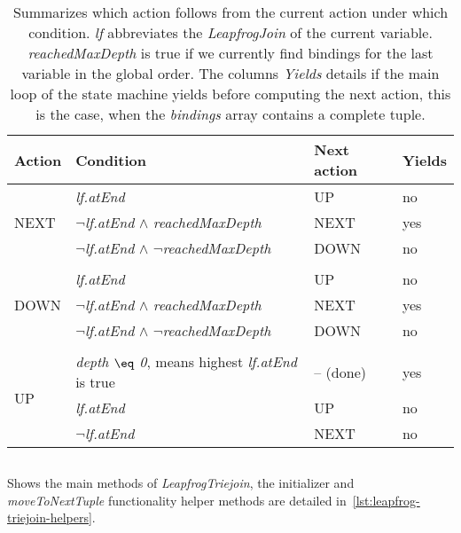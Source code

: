 \begin{table}[]
    \centering
    \begin{tabular}{@{}llll@{}}
        \toprule
        Action                & Condition                                  & Next action & Yields \\ \midrule
        \multirow{3}{*}{NEXT} & \textit{lf.atEnd}                                   & UP          & no     \\
        & \textit{$\neg$lf.atEnd} $\wedge$ \textit{reachedMaxDepth}             & NEXT        & yes    \\
        & \textit{$\neg$lf.atEnd} $\wedge$ \textit{$\neg$reachedMaxDepth}            & DOWN        & no     \\
        & & &\\
        \multirow{3}{*}{DOWN} & \textit{lf.atEnd}                                   & UP          & no     \\
        & \textit{$\neg$lf.atEnd} $\wedge$ \textit{reachedMaxDepth}             & NEXT        & yes    \\
        & \textit{$\neg$lf.atEnd} $\wedge$ \textit{$\neg$reachedMaxDepth}            & DOWN        & no     \\
        & & &\\
        \multirow{3}{*}{UP}     & \textit{depth $\eq$ 0}, means highest \textit{lf.atEnd} is true & -- (done)         & yes    \\
        & \textit{lf.atEnd}                                   & UP          & no     \\
        & \textit{$\neg$lf.atEnd}                                  & NEXT        & no     \\ \bottomrule
    \end{tabular}
    \caption{Summarizes which action follows from the current action under which condition. \textit{lf} abbreviates the
    \textit{LeapfrogJoin} of the current variable.
    \textit{reachedMaxDepth} is true if we currently find bindings for the
    last variable in the global order.
    The columns \textit{Yields} details if the main loop of the state machine yields before computing the next action,
    this is the case, when the \textit{bindings} array contains a complete tuple.
    }
    \label{table:lftj-state-machine}
\end{table}

\begin{listing}[H]
    \inputminted[mathescape, linenos=true]{scala}{code/LeapfrogTriejoinIdiomatic.scala}
    \caption{Shows the main methods of \textit{LeapfrogTriejoin}, the initializer and \textit{moveToNextTuple} functionality
    helper methods are detailed in~\cref{lst:leapfrog-triejoin-helpers}.}
    \label{lst:leapfrog-triejoin}
\end{listing}

